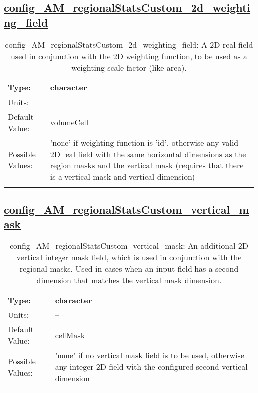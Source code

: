 \subsection[config\_AM\_regionalStatsCustom\_2d\_weighting\_field]{\hyperref[sec:nm_tab_AM_regionalStatsCustom]{config\_AM\_regionalStatsCustom\_2d\_weighting\_field}}
\label{subsec:nm_sec_config_AM_regionalStatsCustom_2d_weighting_field}
\begin{center}
\begin{longtable}{| p{2.0in} || p{4.0in} |}
    \hline
    Type: & character \\
    \hline
    Units: & -- \\
    \hline
    Default Value: & volumeCell \\
    \hline
    Possible Values: & 'none' if weighting function is 'id', otherwise any valid 2D real field with the same horizontal dimensions as the region masks and the vertical mask (requires that there is a vertical mask and vertical dimension) \\
    \hline
    \caption{config\_AM\_regionalStatsCustom\_2d\_weighting\_field: A 2D real field used in conjunction with the 2D weighting function, to be used as a weighting scale factor (like area).}
\end{longtable}
\end{center}
\subsection[config\_AM\_regionalStatsCustom\_vertical\_mask]{\hyperref[sec:nm_tab_AM_regionalStatsCustom]{config\_AM\_regionalStatsCustom\_vertical\_mask}}
\label{subsec:nm_sec_config_AM_regionalStatsCustom_vertical_mask}
\begin{center}
\begin{longtable}{| p{2.0in} || p{4.0in} |}
    \hline
    Type: & character \\
    \hline
    Units: & -- \\
    \hline
    Default Value: & cellMask \\
    \hline
    Possible Values: & 'none' if no vertical mask field is to be used, otherwise any integer 2D field with the configured second vertical dimension \\
    \hline
    \caption{config\_AM\_regionalStatsCustom\_vertical\_mask: An additional 2D vertical integer mask field, which is used in conjunction with the regional masks. Used in cases when an input field has a second dimension that matches the vertical mask dimension.}
\end{longtable}
\end{center}
